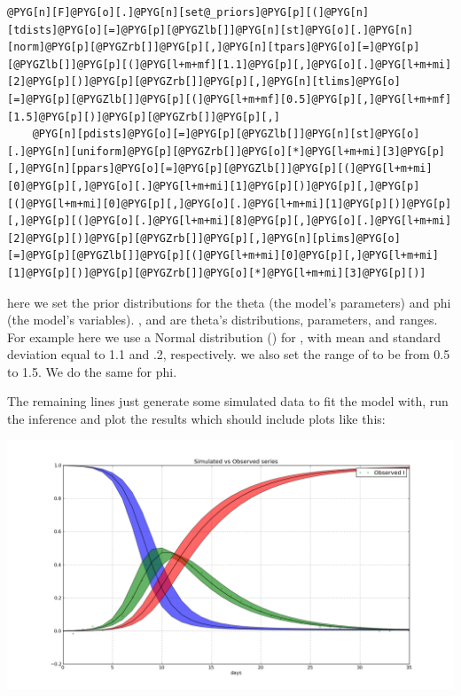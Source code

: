 \documentclass[a4paper,10pt,english]{manual}
\begin{document}
\begin{Verbatim}[commandchars=@\[\]]
@PYG[n][F]@PYG[o][.]@PYG[n][set@_priors]@PYG[p][(]@PYG[n][tdists]@PYG[o][=]@PYG[p][@PYGZlb[]]@PYG[n][st]@PYG[o][.]@PYG[n][norm]@PYG[p][@PYGZrb[]]@PYG[p][,]@PYG[n][tpars]@PYG[o][=]@PYG[p][@PYGZlb[]]@PYG[p][(]@PYG[l+m+mf][1.1]@PYG[p][,]@PYG[o][.]@PYG[l+m+mi][2]@PYG[p][)]@PYG[p][@PYGZrb[]]@PYG[p][,]@PYG[n][tlims]@PYG[o][=]@PYG[p][@PYGZlb[]]@PYG[p][(]@PYG[l+m+mf][0.5]@PYG[p][,]@PYG[l+m+mf][1.5]@PYG[p][)]@PYG[p][@PYGZrb[]]@PYG[p][,]
    @PYG[n][pdists]@PYG[o][=]@PYG[p][@PYGZlb[]]@PYG[n][st]@PYG[o][.]@PYG[n][uniform]@PYG[p][@PYGZrb[]]@PYG[o][*]@PYG[l+m+mi][3]@PYG[p][,]@PYG[n][ppars]@PYG[o][=]@PYG[p][@PYGZlb[]]@PYG[p][(]@PYG[l+m+mi][0]@PYG[p][,]@PYG[o][.]@PYG[l+m+mi][1]@PYG[p][)]@PYG[p][,]@PYG[p][(]@PYG[l+m+mi][0]@PYG[p][,]@PYG[o][.]@PYG[l+m+mi][1]@PYG[p][)]@PYG[p][,]@PYG[p][(]@PYG[o][.]@PYG[l+m+mi][8]@PYG[p][,]@PYG[o][.]@PYG[l+m+mi][2]@PYG[p][)]@PYG[p][@PYGZrb[]]@PYG[p][,]@PYG[n][plims]@PYG[o][=]@PYG[p][@PYGZlb[]]@PYG[p][(]@PYG[l+m+mi][0]@PYG[p][,]@PYG[l+m+mi][1]@PYG[p][)]@PYG[p][@PYGZrb[]]@PYG[o][*]@PYG[l+m+mi][3]@PYG[p][)]
\end{Verbatim}

here we set the prior distributions for the theta (the model's parameters) and phi (the model's variables). ,  and  are theta's distributions, parameters, and ranges. For example here we use a Normal distribution () for , with mean and standard deviation equal to 1.1 and .2, respectively. we also set the range of  to be from 0.5 to 1.5. We do the same for phi.

The remaining lines just generate some simulated data to fit the model with, run the inference and plot the results which should include plots like this:

\includegraphics[width=15cm]{fit_series.png}
\end{document}
